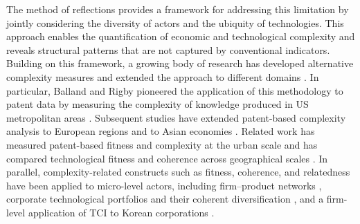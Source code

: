 \documentclass[lineno,pdflatex,sn-mathphys-num]{sn-jnl}%
\theoremstyle{thmstyleone}%
\theoremstyle{thmstyletwo}%
\theoremstyle{thmstylethree}%
\begin{document}
The method of reflections \cite{hidalgo2009eci} provides a framework for addressing this limitation by jointly considering the diversity of actors and the ubiquity of technologies.
This approach enables the quantification of economic and technological complexity and reveals structural patterns that are not captured by conventional indicators.
Building on this framework, a growing body of research has developed alternative complexity measures and extended the approach to different domains \cite{Hidalgo2021,Hidalgo2023,Hausmann2024,Balland2022,diodato2024handbook}.
In particular, Balland and Rigby pioneered the application of this methodology to patent data by measuring the complexity of knowledge produced in US metropolitan areas \cite{balland2017tci}.
Subsequent studies have extended patent-based complexity analysis to European regions \cite{Pinheiro2022,ballandandboschma2021} and to Asian economies \cite{Abay2024}.
Related work has measured patent-based fitness and complexity at the urban scale \cite{straccamore2023urban} and has compared technological fitness and coherence across geographical scales \cite{straccamore2025comparative}.
In parallel, complexity-related constructs such as fitness, coherence, and relatedness have been applied to micro-level actors, including firm--product networks \cite{Bruno2018,Buccellato2016}, corporate technological portfolios and their coherent diversification \cite{pugliese2019coherent}, and a firm-level application of TCI to Korean corporations \cite{Jun2023}.
\end{document}
